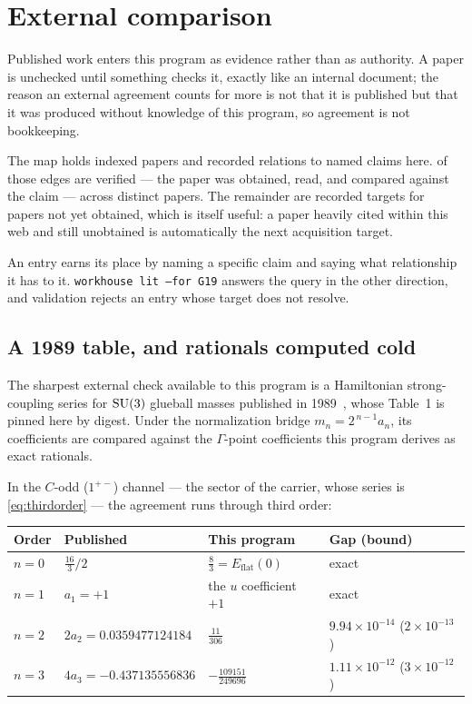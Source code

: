 \section{External comparison}
\label{sec:external}

Published work enters this program as evidence rather than as authority.
A paper is unchecked until something checks it, exactly like an internal
document; the reason an external agreement counts for more is not that
it is published but that it was produced without knowledge of this
program, so agreement is not bookkeeping.

The map holds \LitPapers{} indexed papers and \LitEdges{} recorded
relations to named claims here. \LitVerified{} of those edges are
verified --- the paper was obtained, read, and compared against the
claim --- across \LitObtained{} distinct papers. The remainder are
recorded targets for papers not yet obtained, which is itself useful: a
paper heavily cited within this web and still unobtained is
automatically the next acquisition target.

An entry earns its place by naming a specific claim and saying what
relationship it has to it. \texttt{workhouse lit --for G19} answers the
query in the other direction, and validation rejects an entry whose
target does not resolve.

\subsection{A 1989 table, and rationals computed cold}

The sharpest external check available to this program is a
Hamiltonian strong-coupling series for $\mathrm{SU}(3)$ glueball masses
published in 1989~\cite{HAMER_1989}, whose Table~1 is pinned here by
digest. Under the normalization bridge $m_n = 2^{\,n-1} a_n$, its
coefficients are compared against the $\Gamma$-point coefficients this
program derives as exact rationals.

In the $C$-odd ($1^{+-}$) channel --- the sector of the carrier, whose
series is \eqref{eq:thirdorder} --- the agreement runs through third
order:

\begin{center}
\begin{tabular}{@{}l l l l@{}}
\toprule
Order & Published & This program & Gap (bound) \\
\midrule
$n=0$ & $\tfrac{16}{3}/2$ & $\tfrac83 = E_{\mathrm{flat}}(0)$ & exact \\
$n=1$ & $a_1 = +1$ & the $u$ coefficient $+1$ & exact \\
$n=2$ & $2a_2 = 0.0359477124184$ & $\tfrac{11}{306}$
      & $9.94\times10^{-14}$ ($2\times10^{-13}$) \\
$n=3$ & $4a_3 = -0.437135556836$ & $-\tfrac{109151}{249696}$
      & $1.11\times10^{-12}$ ($3\times10^{-12}$) \\
\bottomrule
\end{tabular}
\end{center}

